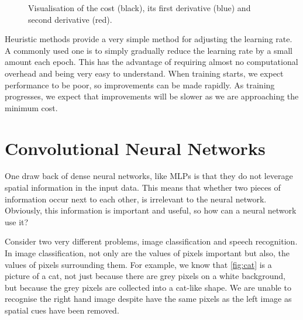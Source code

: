 \begin{figure}
\begin{center}
\caption{Visualisation of the cost (black), its first derivative (blue) and second derivative (red).}
\label{fig:2ndordr}
\end{center}
\end{figure}

Heuristic methods provide a very simple method for adjusting the learning rate. A commonly used one is to simply gradually reduce the learning rate by a small amount each epoch. This has the advantage of requiring almost no computational overhead and being very easy to understand. When training starts, we expect performance to be poor, so improvements can be made rapidly. As training progresses, we expect that improvements will be slower as we are approaching the minimum cost.

\section{Convolutional Neural Networks}
One draw back of dense neural networks, like MLPs is that they do not leverage spatial information in the input data. This means that whether two pieces of information occur next to each other, is irrelevant to the neural network. Obviously, this information is important and useful, so how can a neural network use it?

Consider two very different problems, image classification and speech recognition. In image classification, not only are the values of pixels important but also, the values of pixels surrounding them. For example, we know that \autoref{fig:cat} is a picture of a cat, not just because there are grey pixels on a white background, but because the grey pixels are collected into a cat-like shape. We are unable to recognise the right hand image despite have the same pixels as the left image as spatial cues have been removed.

